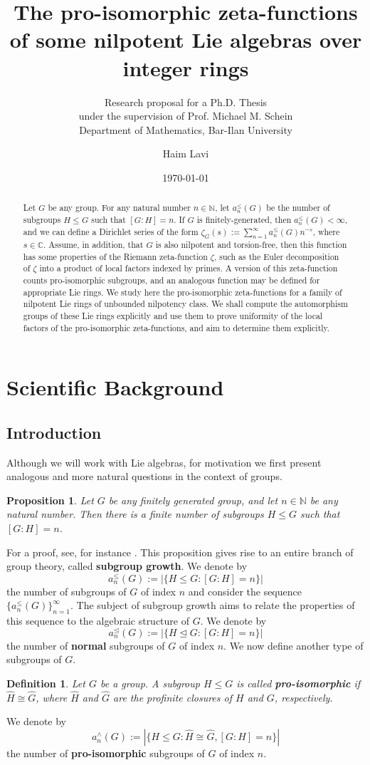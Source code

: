 \documentclass[12pt]{article}
\title{The pro-isomorphic zeta-functions of some nilpotent Lie algebras over integer rings}
\subtitle{Research proposal for a Ph.D. Thesis\\
under the supervision of Prof. Michael M. Schein\\
Department of Mathematics, Bar-Ilan University}
\author{Haim Lavi}
\date{\today}
\newtheorem{proposition}[theorem]{Proposition}
\newtheorem{definition}[theorem]{Definition}
\begin{document}
\maketitle
\newpage
\tableofcontents
\newpage
\begin{abstract}
Let $G$ be any group. For any natural number $n\in\mathbb{N}$, let $a_{n}^{\leq}(G)$ be the number of subgroups $H\leq G$ such that $[G:H]=n$. If $G$ is finitely-generated, then $a_{n}^{\leq}(G)<\infty$, and we can define a Dirichlet series of the form $\zeta_G(s):=\sum_{n=1}^\infty a_{n}^{\leq}(G){n}^{-s}$, where $s\in\mathbb{C}$. Assume, in addition, that $G$ is also nilpotent and torsion-free, then this function has some properties of the Riemann zeta-function $\zeta$, such as the Euler decomposition of $\zeta$ into a product of local factors indexed by primes. A version of this zeta-function counts pro-isomorphic subgroups, and an analogous function may be defined for appropriate Lie rings. We study here the pro-isomorphic zeta-functions for a family of nilpotent Lie rings of unbounded nilpotency class. We shall compute the automorphism groups of these Lie rings explicitly and use them to prove uniformity of the local factors of the pro-isomorphic zeta-functions, and aim to determine them explicitly.
\end{abstract}
\section{Scientific Background}
\subsection{Introduction}
Although we will work with Lie algebras, for motivation we first present analogous and more natural questions in the context of groups.
\begin{proposition} \label{prop:finite.number.subgroups}
Let $G$ be any finitely generated group, and let $n\in\mathbb{N}$ be any natural number. Then there is a finite number of subgroups $H\leq G$ such that $[G:H]=n$.
\end{proposition}
For a proof, see, for instance \cite[Corollary 1.1.2]{LubotzkySegal}.
This proposition gives rise to an entire branch of group theory, called \textbf{subgroup growth}. We denote by \[a_{n}^{\leq}(G):=|\{H\leq{G} : [G:H]=n\}|\]
the number of subgroups of $G$ of index $n$ and consider the sequence $\{a_{n}^{\leq}(G)\}_{n=1}^{\infty}$. The subject of subgroup growth aims to relate the properties of this sequence to the algebraic structure of $G$. We denote by \[a_{n}^{\trianglelefteq}(G):=|\{H\trianglelefteq{G} : [G:H]=n\}|\]
the number of \textbf{normal} subgroups of $G$ of index $n$. We now define another type of subgroups of $G$.
\begin{definition}
\label{def:pro.isomorphic}
Let $G$ be a group. A subgroup $H\leq G$ is called \textbf{pro-isomorphic} if $\widehat{H}\cong\widehat{G}$, where $\widehat{H}$ and $\widehat{G}$ are the profinite closures of $H$ and $G$, respectively.
\end{definition}
We denote by \[a_{n}^{\wedge}(G):=|\{H\leq G : \widehat{H}\cong\widehat{G}, [G:H]=n\}|\]
the number of \textbf{pro-isomorphic} subgroups of $G$ of index $n$.
\end{document}
